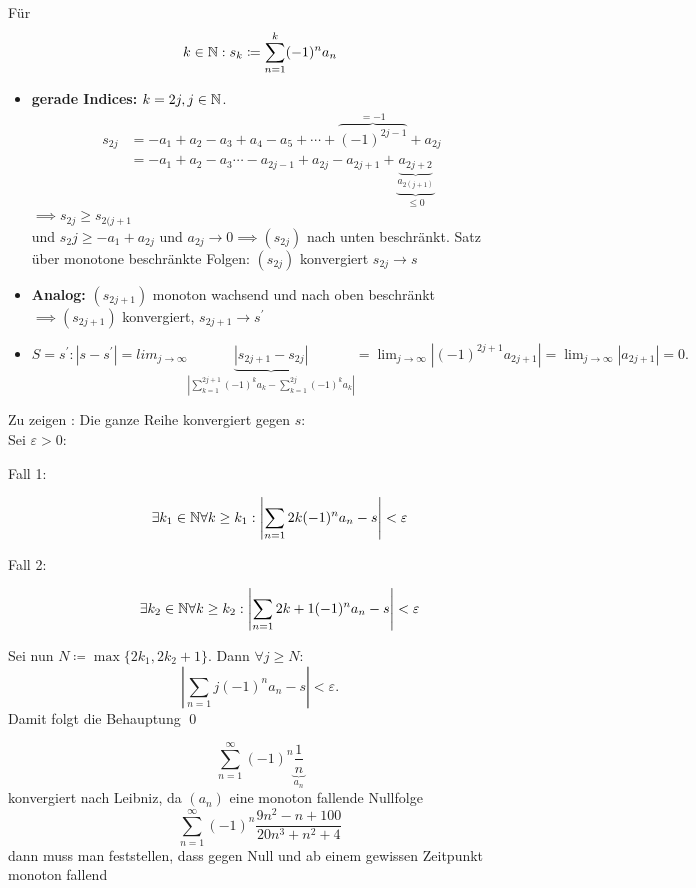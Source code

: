 \begin{subproof*}
	Für
	\[k \in \mathbb{N}: s_k \coloneqq \sum_{n = 1}^{k} (-1)^n a_n \]
	\begin{itemize}
		\item \textbf{gerade Indices:} $ k = 2j, j \in \mathbb{N} $.
			\begin{align*}
				s_{2j} &= - a_1 + a_2 - a_3 + a_4 - a_5 + \dotsb + \overbrace{(-1)^{2j - 1}}^{=-1} + a_{2j} \\
				~&= -a_1 + a_2 - a_3 \dotsb - a_{2j - 1} + a_{2j} - a_{2j + 1} + \underbrace{\underbrace{a_{2j + 2}}_{a_{2(j+1)}}}_{\leq 0}
			\end{align*}
			$\implies s_{2j} \geq s_{2(j+1} $\\
			und $ s_2j \geq -a_1 + a_{2j} $ und $ a_{2j} \to 0 \implies (s_{2j}) $ nach unten beschränkt. Satz über monotone beschränkte Folgen: $ (s_{2j}) $ konvergiert $ s_{2j} \to s $
		\item \textbf{Analog:} $(s_{2j + 1})$ monoton wachsend und nach oben beschränkt $ \implies (s_{2j + 1}) $ konvergiert, $ s_{2j + 1} \to s^\prime $
	\end{itemize}
	\begin{itemize}
		\item $ S = s^\prime: | s - s^\prime | = lim_{j\to\infty} \underbrace{\left| s_{2j + 1} - s_{2j} \right |}_{ \left | \sum_{k=1}^{2j + 1} (-1)^k a_k - \sum_{k=1}^{2j} (-1)^k a_k \right | } = \lim_{j\to\infty} \left| (-1)^{2j + 1} a_{2j+1} \right| = \lim_{j\to\infty} \left | a_{2j + 1} \right| = 0. $
	\end{itemize}
	Zu zeigen : Die ganze Reihe konvergiert gegen $ s $:\\
	Sei $ \varepsilon > 0 $:
	\begin{description}
		\item[Fall 1:]
			\[ \exists k_1 \in \mathbb{N} \forall k \geq k_1 : \left | \sum_{n = 1}{2k} (-1)^n a_n - s \right | < \varepsilon \]
		\item[Fall 2:]
			\[ \exists k_2 \in \mathbb{N} \forall k \geq k_2 : \left | \sum_{n = 1}{2k + 1} (-1)^n a_n - s \right | < \varepsilon \]
	\end{description}
	Sei nun $ N \coloneqq \max\{2k_1, 2k_2 + 1\} $. Dann $ \forall j \geq N: $
			\[ \left | \sum_{n = 1}{j} (-1)^n a_n - s \right | < \varepsilon. \]
			Damit folgt die Behauptung \qed
\end{subproof*}
\begin{subexample}
	\[ \sum_{n=1}^{\infty} (-1)^n \underbrace{\frac{1}{n}}_{a_n} \]
	konvergiert nach Leibniz, da $ (a_n) $ eine monoton fallende Nullfolge
	{\color{red}
	\[ \sum_{n = 1}^{\infty} (-1)^n \frac{9n^2 - n + 100}{20n^3 + n^2 + 4} \]
	dann muss man feststellen, dass gegen Null und ab einem gewissen Zeitpunkt monoton fallend
	}
\end{subexample}

